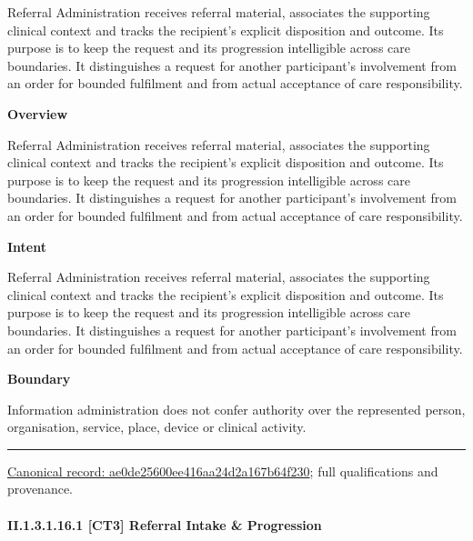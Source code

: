 Referral Administration receives referral material, associates the supporting clinical context and tracks the recipient's explicit disposition and outcome. Its purpose is to keep the request and its progression intelligible across care boundaries. It distinguishes a request for another participant's involvement from an order for bounded fulfilment and from actual acceptance of care responsibility.



\textbf{Overview}



Referral Administration receives referral material, associates the supporting clinical context and tracks the recipient's explicit disposition and outcome. Its purpose is to keep the request and its progression intelligible across care boundaries. It distinguishes a request for another participant's involvement from an order for bounded fulfilment and from actual acceptance of care responsibility.



\textbf{Intent}



Referral Administration receives referral material, associates the supporting clinical context and tracks the recipient's explicit disposition and outcome. Its purpose is to keep the request and its progression intelligible across care boundaries. It distinguishes a request for another participant's involvement from an order for bounded fulfilment and from actual acceptance of care responsibility.



\textbf{Boundary}



Information administration does not confer authority over the represented person, organisation, service, place, device or clinical activity.



\medskip\hrule\medskip

{\footnotesize \href{../../../../continuum/strategy/capability/ae0de25600ee416aa24d2a167b64f230.md}{Canonical record: ae0de25600ee416aa24d2a167b64f230}; full qualifications and provenance.}\par
\paragraph*{II.1.3.1.16.1 [CT3] Referral Intake \& Progression}
\label{navigation:II.1.3.1.16.1}

